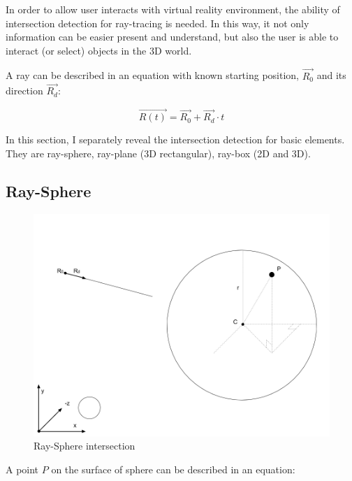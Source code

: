 In order to allow user interacts with virtual reality environment, the ability of intersection detection for ray-tracing is needed. In this way, it not only information can be easier present and understand, but also the user is able to interact (or select) objects in the 3D world.

A ray can be described in an equation with known starting position, $\overrightarrow{R_0}$ and its direction $\overrightarrow{R_d}$:

\begin{equation}
\label{equ:ray-t}
\overrightarrow{R(t)} = \overrightarrow{R_0} + \overrightarrow{R_d} \cdot t
\end{equation}

In this section, I separately reveal the intersection detection for basic elements. They are ray-sphere, ray-plane (3D rectangular), ray-box (2D and 3D).

\subsection{Ray-Sphere}
\label{section:ray-sphere}

\begin{figure}[H]
\caption{Ray-Sphere intersection}
\label{fig:ray-sphere}
\centering
\includegraphics[width=\textwidth, keepaspectratio]{Figures/ray-sphere-intersection.png}
\decoRule
\end{figure}

A point $P$ on the surface of sphere can be described in an equation:

